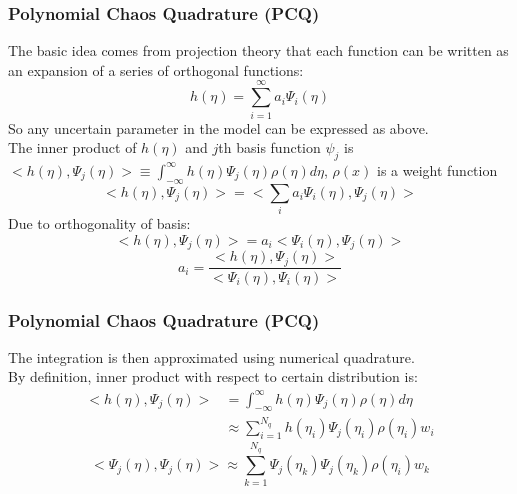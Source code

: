 \documentclass[10pt]{beamer}
\begin{document}
\begin{frame}
\frametitle{Polynomial Chaos Quadrature (PCQ)}
The basic idea comes from projection theory that each function can be written as an expansion of a series of orthogonal functions:\\
\begin{equation}
     h(\eta)= \sum_{i=1}^\infty a_i \Psi_i (\eta) \label{eq:pcq-expansion}  
\end{equation}
So any uncertain parameter in the model can be expressed as above. \\
The inner product of $h(\eta)$ and $j$th basis function $\psi_j$ is $<h(\eta), \Psi_j (\eta) > \equiv \int_{-\infty}^{\infty} h(\eta) \Psi_j (\eta) \rho(\eta) d \eta $, $\rho(x)$ is a weight function
\begin{equation}
     <h(\eta), \Psi_j (\eta) >= <\sum_i a_i \Psi_i (\eta), \Psi_j (\eta)>\label{eq:pcq-inner-product}
\end{equation}
Due to orthogonality of basis:
\begin{equation}
     <h(\eta), \Psi_j (\eta) >= a_i<\Psi_i (\eta), \Psi_j (\eta)> \label{eq:pcq-inner-product-orthogonal}
\end{equation}
\begin{equation}
     a_i= \frac{<h(\eta), \Psi_j (\eta) >}{<\Psi_i (\eta), \Psi_i (\eta)>}\label{eq:pcq-coef}
\end{equation}
\end{frame}
\begin{frame}
\frametitle{Polynomial Chaos Quadrature (PCQ)}
The integration is then approximated using numerical quadrature.\\
By definition, inner product with respect to certain distribution is:
\begin{equation}
\begin{split}
      <h(\eta), \Psi_j (\eta) > &= \int_{-\infty}^{\infty} h(\eta) \Psi_j (\eta) \rho(\eta) d \eta \\
      &\approx \sum_{i=1}^{N_q} h(\eta_i) \Psi_j (\eta_i) \rho(\eta_i) w_i 
\end{split} \label{eq:pcq-gaussian-h} 
\end{equation}
\begin{equation}
      <\Psi_j (\eta), \Psi_j (\eta) > \approx \sum_{k=1}^{N_q} \Psi_j (\eta_k) \Psi_j (\eta_k) \rho(\eta_i)w_k \label{eq:pcq-gaussian-psi} 
\end{equation}
\end{frame}
\end{document}
